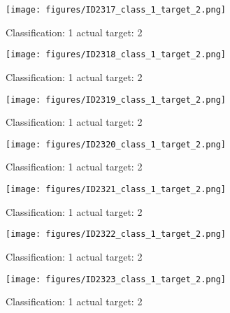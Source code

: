 \begin{figure}[h!]
\begin{center}
\texttt{[image: figures/ID2317\_class\_1\_target\_2.png]}
\end{center}
\caption{ Classification: 1 actual target: 2}
\label{fig:ID2317_class_1_target_2}
\end{figure}
\begin{figure}[h!]
\begin{center}
\texttt{[image: figures/ID2318\_class\_1\_target\_2.png]}
\end{center}
\caption{ Classification: 1 actual target: 2}
\label{fig:ID2318_class_1_target_2}
\end{figure}
\begin{figure}[h!]
\begin{center}
\texttt{[image: figures/ID2319\_class\_1\_target\_2.png]}
\end{center}
\caption{ Classification: 1 actual target: 2}
\label{fig:ID2319_class_1_target_2}
\end{figure}
\begin{figure}[h!]
\begin{center}
\texttt{[image: figures/ID2320\_class\_1\_target\_2.png]}
\end{center}
\caption{ Classification: 1 actual target: 2}
\label{fig:ID2320_class_1_target_2}
\end{figure}
\begin{figure}[h!]
\begin{center}
\texttt{[image: figures/ID2321\_class\_1\_target\_2.png]}
\end{center}
\caption{ Classification: 1 actual target: 2}
\label{fig:ID2321_class_1_target_2}
\end{figure}
\begin{figure}[h!]
\begin{center}
\texttt{[image: figures/ID2322\_class\_1\_target\_2.png]}
\end{center}
\caption{ Classification: 1 actual target: 2}
\label{fig:ID2322_class_1_target_2}
\end{figure}
\begin{figure}[h!]
\begin{center}
\texttt{[image: figures/ID2323\_class\_1\_target\_2.png]}
\end{center}
\caption{ Classification: 1 actual target: 2}
\label{fig:ID2323_class_1_target_2}
\end{figure}
